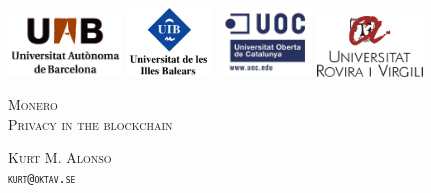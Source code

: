 \documentclass[a4paper,11pt,english,oneside,onecolumn,final,openany]{report}
\begin{document}

\pagestyle{plain}
\thispagestyle{empty}

\mbox{}
\vspace{1cm}
\begin{center}
  \includegraphics[width=3cm]{front/figures/logo_uab.jpg}
  \hspace{0.5cm}
  \includegraphics[width=2.3cm]{front/figures/logo_uib.jpg}
  \hspace{0.5cm}
  \includegraphics[width=2.5cm]{front/figures/logo_uoc.jpg}
  \hspace{0.5cm}
  \includegraphics[width=2.8cm]{front/figures/logo_urv.jpg}
\end{center}


\vfill{}
{\par\centering \textsc{\LARGE Monero \\Privacy in the blockchain}\par}
\bigskip
{\par\centering \textsc{\large Kurt M. Alonso \\ {\tt kurt@oktav.se}}\par} %
\vfill{}

\begin{center}
  \begin{minipage}[t]{0.8\columnwidth}
 
  
  
  \end{minipage}
\end{center}
\end{document}
